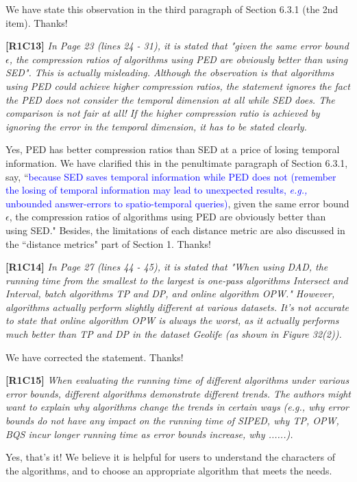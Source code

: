 \documentclass{letter}
\newcommand{\eg}{\emph{e.g.,}\xspace}
\begin{document}
{We have state this observation in the third paragraph of Section 6.3.1 (the 2{nd} item). Thanks!



\textbf{[R1C13]} \emph{ In Page 23 (lines 24 - 31), it is stated that "given the same error bound $\epsilon$, the compression ratios of algorithms using PED are obviously better than using SED". This is actually misleading. Although the observation is that algorithms using PED could achieve higher compression ratios, the statement ignores the fact the PED does not consider the temporal dimension at all while SED does. The comparison is not fair at all! If the higher compression ratio is achieved by ignoring the error in the temporal dimension, it has to be stated clearly.} 

Yes, PED has better compression ratios than SED at a price of losing temporal information. We have clarified this in the penultimate paragraph of Section 6.3.1, say, ``\textcolor{blue}{because SED saves temporal information while PED does not (remember the losing of temporal information may lead to unexpected results, \eg unbounded answer-errors to spatio-temporal queries)}, given the same error bound $\epsilon$, the compression ratios of algorithms using PED are obviously better than using SED." 
Besides, the limitations of each distance metric are also discussed in the ``distance metrics" part of Section 1. Thanks!

\textbf{[R1C14]} \emph{ In Page 27 (lines 44 - 45), it is stated that "When using DAD, the running time from the smallest to the largest is one-pass algorithms Intersect and Interval, batch algorithms TP and DP, and online algorithm OPW." However, algorithms actually perform slightly different at various datasets. It's not accurate to state that online algorithm OPW is always the worst, as it actually performs much better than TP and DP in the dataset Geolife (as shown in Figure 32(2)).}

We have corrected the statement. Thanks!

\textbf{[R1C15]} \emph{ When evaluating the running time of different algorithms under various error bounds, different algorithms demonstrate different trends. The authors might want to explain why algorithms change the trends in certain ways (e.g., why error bounds do not have any impact on the running time of SIPED, why TP, OPW, BQS incur longer running time as error bounds increase, why ......).}

Yes, that's it! We believe it is helpful for users to understand the characters of the algorithms, and to choose an appropriate algorithm that meets the needs.

}
\end{document}
